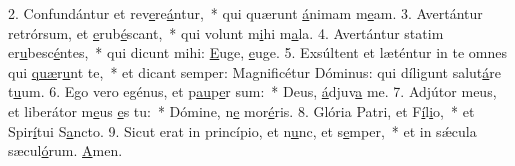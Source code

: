 2. Confundántur et rev\uline{e}re\uline{á}ntur,~* qui quærunt \uline{á}nimam m\uline{e}am.
3. Avertántur retrórsum, et \uline{e}rub\uline{é}scant,~* qui volunt m\uline{i}hi m\uline{a}la.
4. Avertántur statim er\uline{u}besc\uline{é}ntes,~* qui dicunt mihi: \uline{E}uge, \uline{e}uge.
5. Exsúltent et læténtur in te omnes qui \uline{quæ}r\uline{u}nt te,~* et dicant semper: Magnificétur Dóminus: qui díligunt salut\uline{á}re t\uline{u}um.
6. Ego vero egénus, et p\uline{au}p\uline{e}r sum:~* Deus, \uline{á}djuv\uline{a} me.
7. Adjútor meus, et liberátor m\uline{e}us \uline{e}s tu:~* Dómine, n\uline{e} mor\uline{é}ris.
8. Glória Patri, et F\uline{í}l\uline{i}o,~* et Spir\uline{í}tui S\uline{a}ncto.
9. Sicut erat in princípio, et n\uline{u}nc, et s\uline{e}mper,~* et in sǽcula sæcul\uline{ó}rum. \uline{A}men.
